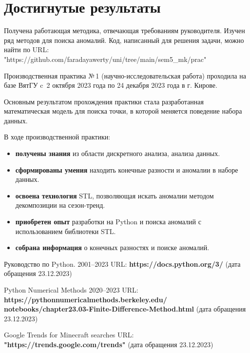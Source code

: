 \documentclass[14pt,Otchet]{diplomwork}
\begin{document}
\section{Достигнутые результаты}
Получена работающая методика, отвечающая требованиям руководителя. Изучен ряд методов для поиска аномалий.
Код, написанный для решения задачи, можно найти по URL: "https://github.com/faradayawerty/uni/tree/main/sem5\_mk/prac"




Производственная практика №\,1 (научно-исследовательская работа) проходила на базе ВятГУ c~2 октября 2023 года по 24 декабря 2023 года в г. Кирове.

Основным результатом прохождения практики стала разработанная
математическая модель для поиска точки, в которой меняется поведение
набора данных.

В ходе производственной практики:

\begin{itemize}
	\item \textbf{получены знания} из области дискретного анализа, анализа данных.
	\item \textbf{сформированы умения} находить конечные разности и аномалии в наборе данных.
	\item \textbf{освоена технология} STL, позволяющая искать аномалии методом декомпозиции на сезон-тренд.
	\item \textbf{приобретен опыт} разработки на Python и поиска аномалий с использованием библиотеки STL.
	\item \textbf{собрана информация} о конечных разностях и поиске аномалий.
\end{itemize}








\begin{thebibliography}{9}
\label{sec:bib}

Руководство по Python. 2001--2023 URL: \textbf{https://docs.python.org/3/} (дата обращения 23.12.2023)

Python Numerical Methods 2020--2023 URL: \textbf{https://pythonnumericalmethods.berkeley.edu/
notebooks/chapter23.03-Finite-Difference-Method.html}
(дата обращения 23.12.2023)

Google Trends for Minecraft searches URL: \textbf{"https://trends.google.com/trends"}
(дата обращения 23.12.2023)


\end{thebibliography}
\end{document}
